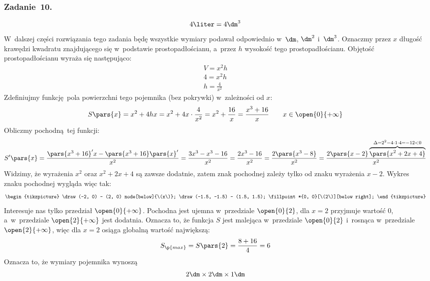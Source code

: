\subsubsection*{Zadanie~10.}
\begin{equation*}
    4\liter = 4\dm^3
\end{equation*}
W~dalszej części rozwiązania tego zadania będę wszystkie wymiary podawał odpowiednio w~\(\dm\), \(\dm^2\) i~\(\dm^3\). Oznaczmy przez \(x\) długość krawędzi kwadratu znajdującego się w~podstawie prostopadłościanu, a~przez \(h\) wysokość tego prostopadłościanu. Objętość prostopadłościanu wyraża się następująco:
\begin{gather*}
    V = x^2h\\
    4 = x^2h\\
    h = \frac{4}{x^2}
\end{gather*}
Zdefiniujmy funkcję pola powierzchni tego pojemnika (bez pokrywki) w~zależności od \(x\):
\begin{equation*}
    S\pars{x}
        = x^2 + 4hx = x^2 + 4x \cdot \frac{4}{x^2}
        = x^2 + \frac{16}{x}
        = \frac{x^3 + 16}{x} \qquad x \in \open{0}{+\infty}
\end{equation*}
Obliczmy pochodną tej funkcji:
\begin{equation*}
    S'\pars{x}
        = \frac{\pars{x^3 + 16}'x - \pars{x^3 + 16}\pars{x}'}{x^2}
        = \frac{3x^3 - x^3 - 16}{x^2}
        = \frac{2x^3 - 16}{x^2}
        = \frac{2\pars{x^3 - 8}}{x^2}
        = \frac{2\pars{x - 2}\overbrace{\pars{x^2 + 2x + 4}}^{\Delta = 2^2 - 4 \cdot 1 \cdot 4 = -12 < 0}}{x^2}
\end{equation*}
Widzimy, że wyrażenia \(x^2\) oraz \(x^2 + 2x + 4\) są zawsze dodatnie, zatem znak pochodnej zależy tylko od znaku wyrażenia \(x - 2\). Wykres znaku pochodnej wygląda więc tak:
\begin{equation*}
    \begin{tikzpicture}
        \draw (-2, 0) -- (2, 0) node[below]{\(x\)};
        \draw (-1.5, -1.5) -- (1.5, 1.5);
        \fillpoint*{0, 0}[\(2\)][below right];
    \end{tikzpicture}
\end{equation*}
Interesuje nas tylko przedział \(\open{0}{+\infty}\). Pochodna jest ujemna w~przedziale \(\open{0}{2}\), dla \(x = 2\) przyjmuje wartość \(0\), a~w~przedziale \(\open{2}{+\infty}\) jest dodatnia. Oznacza to, że funkcja \(S\) jest malejąca w~przedziale \(\open{0}{2}\) i~rosnąca w~przedziale \(\open{2}{+\infty}\), więc dla \(x = 2\) osiąga globalną wartość największą:
\begin{equation*}
    S_\p{max} = S\pars{2} = \frac{8 + 16}{4} = 6
\end{equation*}
Oznacza to, że wymiary pojemnika wynoszą
\begin{equation*}
    2\dm \times 2\dm \times 1\dm
\end{equation*}
